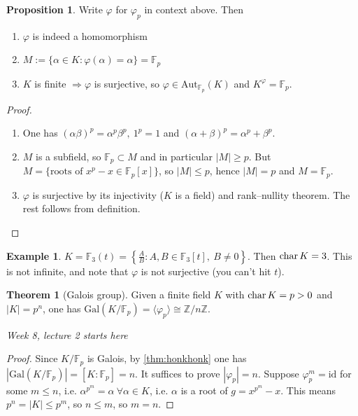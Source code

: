 \documentclass[a4paper]{article}
\newcommand{\Z}{\mathbb Z}
\newcommand{\gal}{\text{Gal}}
\newcommand{\Aut}{\text{Aut}}
\newcommand{\Char}{\text{char\,}}
\newcommand{\id}{\text{id}}
\theoremstyle{definition}
\newtheorem{prop}[defn]{Proposition}
\newtheorem{thm}[defn]{Theorem}
\newtheorem{example}[defn]{Example}
\begin{document}
\begin{prop}
Write $\varphi$ for $\varphi_p$ in context above. Then
\begin{enumerate}
\item $\varphi$ is indeed a homomorphism
\item $M:=\{\alpha\in K:\varphi(\alpha)=\alpha\}=\mathbb F_p$
\item $K$ is finite $\Rightarrow \varphi$ is surjective, so $\varphi\in\Aut_{\mathbb F_p}(K)$ and $K^\varphi=\mathbb F_p$.
\end{enumerate}
\end{prop}
\begin{proof}
\begin{enumerate}
\item One has $(\alpha\beta)^p=\alpha^p\beta^p,\ 1^p=1$ and $(\alpha+\beta)^p=\alpha^p+\beta^p$.
\item $M$ is a subfield, so $\mathbb F_p\subset M$ and in particular $|M|\geq p$. But $M=\{\text{roots of }x^p-x\in\mathbb F_p[x]\}$, so $|M|\leq p$, hence $|M|=p$ and $M=\mathbb F_p$.
\item $\varphi$ is surjective by its injectivity ($K$ is a field) and rank–nullity theorem. The rest follows from definition.
\end{enumerate}
\end{proof}

\begin{example}
$K=\mathbb F_3(t)=\left\{ \frac{A}{B}:A,B\in\mathbb F_3[t],\ B\neq 0 \right\}$. Then $\Char K=3$. This is not infinite, and note that $\varphi$ is not surjective (you can't hit $t$).
\end{example}

\begin{thm}[Galois group]
Given a finite field $K$ with $\Char K=p>0$ and $|K|=p^n$, one has $\gal(K/\mathbb F_p)=\langle\varphi_p\rangle\cong\Z/n\Z$.
\end{thm}

\begin{flushright}
\textit{Week 8, lecture 2 starts here}
\end{flushright}

\begin{proof}
Since $K/\mathbb F_p$ is Galois, by \ref{thm:honkhonk} one has $|\gal(K/\mathbb F_p)|=[K:\mathbb F_p]=n$. It suffices to prove $|\varphi_p|=n$. Suppose $\varphi_p^m=\id$ for some $m\leq n$, i.e. $\alpha^{p^m}=\alpha \ \forall\alpha\in K$, i.e. $\alpha$ is a root of $g=x^{p^m}-x$. This means $p^n=|K|\leq p^m$, so $n\leq m$, so $m=n$.
\end{proof}
\end{document}
